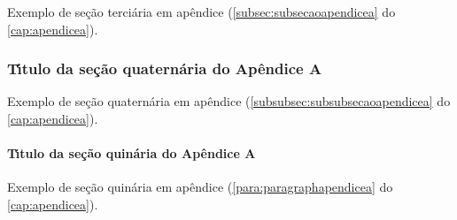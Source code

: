 Exemplo de se\c{c}\~ao terci\'aria em ap\^endice (\autoref{subsec:subsecaoapendicea} do \autoref{cap:apendicea}).

\subsubsection{T\'{\i}tulo da se\c{c}\~ao quatern\'aria do Ap\^endice A}\label{subsubsec:subsubsecaoapendicea}

Exemplo de se\c{c}\~ao quatern\'aria em ap\^endice (\autoref{subsubsec:subsubsecaoapendicea} do \autoref{cap:apendicea}).

\paragraph{T\'{\i}tulo da se\c{c}\~ao quin\'aria do Ap\^endice A}\label{para:paragraphapendicea}

Exemplo de se\c{c}\~ao quin\'aria em ap\^endice (\autoref{para:paragraphapendicea} do \autoref{cap:apendicea}).
